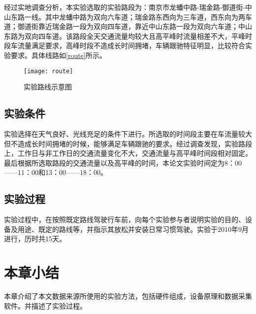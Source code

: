 经过实地调查分析，本实验选取的实验路段为：南京市龙蟠中路-瑞金路-御道街-中山东路一线。其中龙蟠中路为双向六车道；瑞金路东西向为三车道，西东向为两车道；御道街靠近瑞金路一段为双向四车道，靠近中山东路一段为双向六车道；中山东路为双向四车道。该路段全天交通流量均较大且高平峰时流量相差不大，平峰时段车流量满足要求，高峰时段不造成长时间拥堵，车辆跟驰特征明显，比较符合实验要求。具体线路如\autoref{route}所示。

\begin{figure}[htpb]
	\centering
	\texttt{[image: route]}
	\caption{实验路线示意图}
	\label{route}
\end{figure}

\subsection{实验条件}
实验选择在天气良好、光线充足的条件下进行。所选取的时间段主要在车流量较大但不造成长时间拥堵的时候，能够满足车辆跟驰的要求。经过调查发现，实验路段上，工作日与非工作日的交通流量变化不大，交通流量与高平峰时间段相对固定。最后根据所选取路段的交通流量以及高平峰的时间，本论文实验时间定为8：00——11：00和13：00——18：00。
\subsection{实验过程}
实验过程中，在按照既定路线驾驶行车前，向每个实验参与者说明实验的目的、设备及用途、既定的路线等，并指示其放松并安装日常习惯驾驶。实验于2010年9月进行，历时共15天。



\section{本章小结}
本章介绍了本文数据来源所使用的实验方法，包括硬件组成，设备原理和数据采集软件。并描述了实验过程。
















